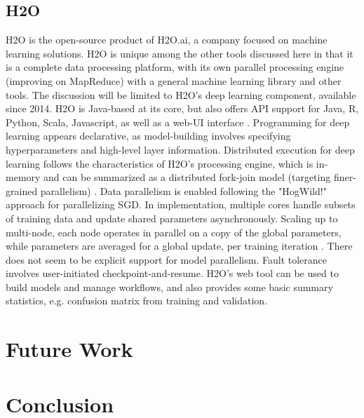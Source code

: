 \documentclass{article}
\begin{document}
\subsection{H2O}
H2O is the open-source product of H2O.ai, a company focused on machine learning solutions. H2O is unique among the other tools discussed here in that it is a complete data processing platform, with its own parallel processing engine (improving on MapReduce) with a general machine learning library and other tools. The discussion will be limited to H2O's deep learning component, available since 2014. H2O is Java-based at its core, but also offers API support for Java, R, Python, Scala, Javascript, as well as a web-UI interface \cite{candel2015deep}. Programming for deep learning appears declarative, as model-building involves specifying hyperparameters and high-level layer information. Distributed execution for deep learning follows the characteristics of H2O's processing engine, which is in-memory and can be summarized as a distributed fork-join model (targeting finer-grained parallelism) \cite{Landset2015}. Data parallelism is enabled following the "HogWild!" \cite{recht2011hogwild} approach for parallelizing SGD. In implementation, multiple cores handle subsets of training data and update shared parameters asynchronously. Scaling up to multi-node, each node operates in parallel on a copy of the global parameters, while parameters are averaged for a global update, per training iteration \cite{candel2015deep}. There does not seem to be explicit support for model parallelism. Fault tolerance involves user-initiated checkpoint-and-resume. H2O's web tool can be used to build models and manage workflows, and also provides some basic summary statistics, e.g. confusion matrix from training and validation. 

\section{Future Work}
\section{Conclusion}

 

\end{document}

